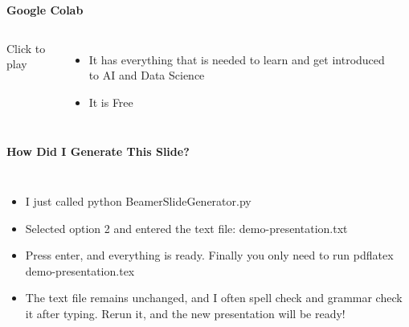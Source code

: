 \documentclass[aspectratio=169]{beamer}
\begin{document}
\begin{frame}{\Large\textbf{Google Colab}}
    \begin{columns}[T]
        \centering

        \vspace{0.5em}
        \footnotesize{Click to play}

        \begin{itemize}
            \item It has everything that is needed to learn and get introduced to AI and Data Science
            \item It is Free
        \end{itemize}
        \vfill  %
        \hspace{1em}\rule{0.4\textwidth}{0.4pt}\newline\hspace{1em}{\tiny Source: https://www.youtube.com/watch?v=oCngVVBSsmA} 
    \end{columns}
\end{frame}


\begin{frame}{\Large\textbf{How Did I Generate This Slide?}}
    \begin{columns}[T]
        \centering
        \begin{itemize}
            \item I just called \textcolor[RGB]{255,165,0}{python BeamerSlideGenerator.py}
            \item Selected option 2 and entered the text file:  demo-presentation.txt
            \item Press enter, and everything is ready. Finally you only need to run \textcolor[RGB]{255,165,0}{pdflatex demo-presentation.tex}
            \item The text file remains unchanged, and I often spell check and grammar check it after typing. Rerun it, and the new presentation will be ready!
        \end{itemize}
    \end{columns}
\end{frame}
\end{document}
